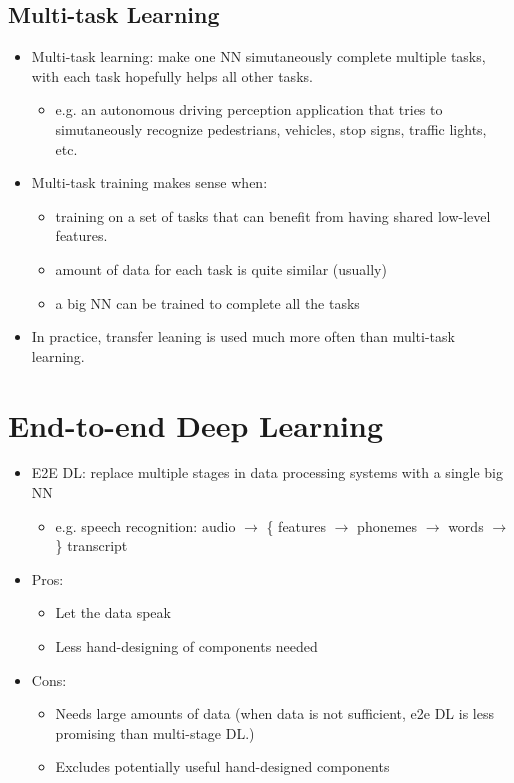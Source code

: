 \subsection{Multi-task Learning}
\begin{itemize}
  \item Multi-task learning: make one NN simutaneously complete multiple tasks, with each task hopefully helps all other tasks. 
  \begin{itemize}
    \item e.g. an autonomous driving perception application that tries to simutaneously recognize pedestrians, vehicles, stop signs, traffic lights, etc.
  \end{itemize}
  \item Multi-task training makes sense when:
  \begin{itemize}
    \item training on a set of tasks that can benefit from having shared low-level features.
    \item amount of data for each task is quite similar (usually)
    \item a big NN can be trained to complete all the tasks
  \end{itemize}
  \item In practice, transfer leaning is used much more often than multi-task learning.
\end{itemize}
\section{End-to-end Deep Learning}
\begin{itemize}
  \item E2E DL: replace multiple stages in data processing systems with a single big NN
  \begin{itemize}
    \item e.g. speech recognition: audio $\rightarrow$ \{ features $\rightarrow$ phonemes $\rightarrow$ words $\rightarrow$ \} transcript
  \end{itemize}
  \item Pros:
  \begin{itemize}
    \item Let the data speak
    \item Less hand-designing of components needed
  \end{itemize}
  \item Cons:
  \begin{itemize}
    \item Needs large amounts of data (when data is not sufficient, e2e DL is less promising than multi-stage DL.)
    \item Excludes potentially useful hand-designed components
  \end{itemize}
\end{itemize}
\ifx\PREAMBLE\undefined

\fi